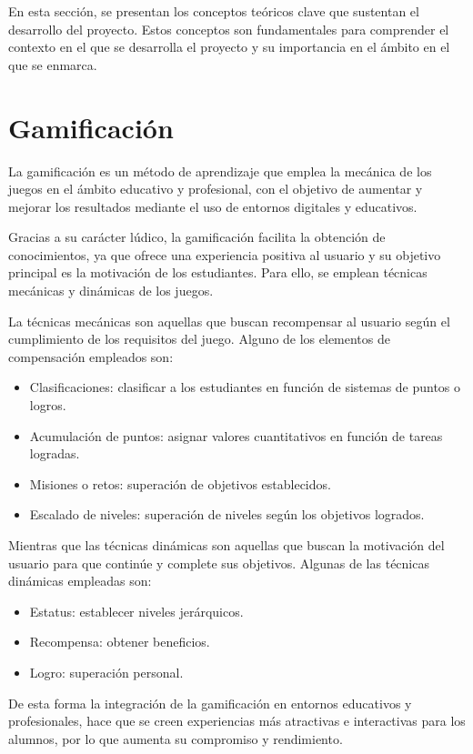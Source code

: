
En esta sección, se presentan los conceptos teóricos clave que sustentan el desarrollo del proyecto. Estos conceptos son fundamentales para comprender el contexto en el que se desarrolla el proyecto y su importancia en el ámbito en el que se enmarca.

\section{Gamificación}
\cite{gamificacion1} La gamificación es un método de aprendizaje que emplea la mecánica de los juegos en el ámbito educativo y profesional, con el objetivo de aumentar y mejorar los resultados mediante el uso de entornos digitales y educativos.

Gracias a su carácter lúdico, la gamificación facilita la obtención de conocimientos, ya que ofrece una experiencia positiva al usuario y su objetivo principal es la motivación de los estudiantes. Para ello, se emplean técnicas mecánicas y dinámicas de los juegos.

\cite{gamificacion2} La técnicas mecánicas son aquellas que buscan recompensar al usuario según el cumplimiento de los requisitos del juego. Alguno de los elementos de compensación empleados son:
\begin{itemize}
    \item Clasificaciones: clasificar a los estudiantes en función de sistemas de puntos o logros.
    \item Acumulación de puntos: asignar valores cuantitativos en función de tareas logradas.
    \item Misiones o retos: superación de objetivos establecidos.
    \item Escalado de niveles: superación de niveles según los objetivos logrados.
\end{itemize}

Mientras que las técnicas dinámicas son aquellas que buscan la motivación del usuario para que continúe y complete sus objetivos. Algunas de las técnicas dinámicas empleadas son:
\begin{itemize}
    \item Estatus: establecer niveles jerárquicos.
    \item Recompensa: obtener beneficios.
    \item Logro: superación personal.
\end{itemize}

De esta forma la integración de la gamificación en entornos educativos y profesionales, hace que se creen experiencias más atractivas e interactivas para los alumnos, por lo que aumenta su compromiso y rendimiento.

